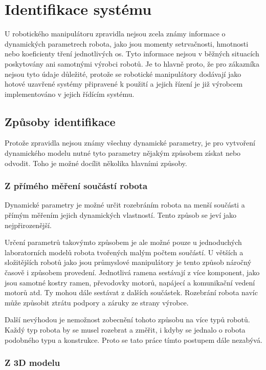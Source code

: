 

\chapter{Identifikace systému}

U robotického manipulátoru zpravidla nejsou zcela známy informace o dynamických parametrech robota, jako jsou momenty setrvačnosti, hmotnosti nebo koeficienty tření jednotlivých os. Tyto informace nejsou v běžných situacích poskytovány ani samotnými výrobci robotů. Je to hlavně proto, že pro zákazníka nejsou tyto údaje důležité, protože se robotické manipulátory dodávají jako hotové uzavřené systémy připravené k použití a jejich řízení je již výrobcem implementováno v jejich řídícím systému.

\section{Způsoby identifikace}

Protože zpravidla nejsou známy všechny dynamické parametry, je pro vytvoření dynamického modelu nutné tyto parametry nějakým způsobem získat nebo odvodit. Toho je možné docílit několika hlavními způsoby.

\subsection{Z přímého měření součástí robota}

Dynamické parametry je možné určit rozebráním robota na menší součásti a přímým měřením jejich dynamických vlastností. Tento způsob se jeví jako nejpřirozenější.

Určení parametrů takovýmto způsobem je ale možné pouze u jednoduchých laboratorních modelů robota tvořených malým počtem součástí. U větších a složitějších robotů jako jsou průmyslové manipulátory je tento způsob náročný časově i způsobem provedení. Jednotlivá ramena sestávají z více komponent, jako jsou samotné kostry ramen, převodovky motorů, napájecí a komunikační vedení motorů atd. Ty mohou dále sestávat z dalších součástek. Rozebrání robota navíc může způsobit ztrátu podpory a záruky ze strany výrobce.

Další nevýhodou je nemožnost zobecnění tohoto způsobu na více typů robotů. Každý typ robota by se musel rozebrat a změřit, i kdyby se jednalo o robota podobného typu a konstrukce. Proto se tato práce tímto postupem dále nezabývá.    

\subsection{Z 3D modelu}


